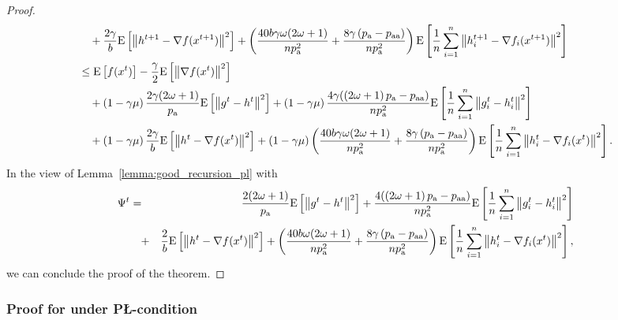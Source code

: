 \documentclass{article}
\newcommand{\algorithmname}{DARIA}
\newcommand*{\probavailable}{\ensuremath{p_{\textnormal{a}}}}
\newcommand*{\probpairaa}{\ensuremath{p_{\textnormal{aa}}}}
\begin{document}
\begin{proof}
\begin{align*}
      &\quad  + \frac{2\gamma}{b} \Exp{\norm{h^{t+1} - \nabla f(x^{t+1})}^2} + \left(\frac{40 b \gamma \omega (2 \omega + 1)}{n \probavailable^2} + \frac{8 \gamma \left(\probavailable - \probpairaa\right)}{n \probavailable^2}\right) \Exp{\frac{1}{n}\sum_{i=1}^n\norm{h^{t+1}_i - \nabla f_i(x^{t+1})}^2}\\
      &\leq \Exp{f(x^t)} - \frac{\gamma}{2}\Exp{\norm{\nabla f(x^t)}^2} \\
      &\quad + \left(1 - \gamma \mu\right)\frac{2\gamma (2 \omega + 1)}{\probavailable} \Exp{\norm{g^{t} - h^{t}}^2} + \left(1 - \gamma \mu\right)\frac{4\gamma (\left(2 \omega + 1\right)\probavailable - \probpairaa)}{n \probavailable^2} \Exp{\frac{1}{n}\sum_{i=1}^n\norm{g^{t}_i - h^{t}_i}^2} \\
      &\quad + \left(1 - \gamma \mu\right)\frac{2\gamma}{b} \Exp{\norm{h^{t} - \nabla f(x^{t})}^2} + \left(1 - \gamma \mu\right)\left(\frac{40 b \gamma \omega (2 \omega + 1)}{n \probavailable^2} + \frac{8 \gamma \left(\probavailable - \probpairaa\right)}{n \probavailable^2}\right)\Exp{\frac{1}{n}\sum_{i=1}^n\norm{h^{t}_i - \nabla f_i(x^{t})}^2}.
    \end{align*}
    In the view of Lemma~\ref{lemma:good_recursion_pl} with
    \begin{eqnarray*}
        \Psi^t &=& \frac{2(2 \omega + 1)}{\probavailable} \Exp{\norm{g^{t} - h^{t}}^2} + \frac{4(\left(2 \omega + 1\right)\probavailable - \probpairaa)}{n \probavailable^2} \Exp{\frac{1}{n}\sum_{i=1}^n\norm{g^{t}_i - h^{t}_i}^2} \\
        &\quad +& \frac{2}{b} \Exp{\norm{h^{t} - \nabla f(x^{t})}^2} + \left(\frac{40 b \omega (2 \omega + 1)}{n \probavailable^2} + \frac{8 \gamma \left(\probavailable - \probpairaa\right)}{n \probavailable^2}\right)\Exp{\frac{1}{n}\sum_{i=1}^n\norm{h^{t}_i - \nabla f_i(x^{t})}^2},
    \end{eqnarray*}
    we can conclude the proof of the theorem.
\end{proof}

\subsubsection{Proof for \algname{\algorithmname-PAGE} under P\L-condition}

\CONVERGENCEPLPAGE*
\end{document}
